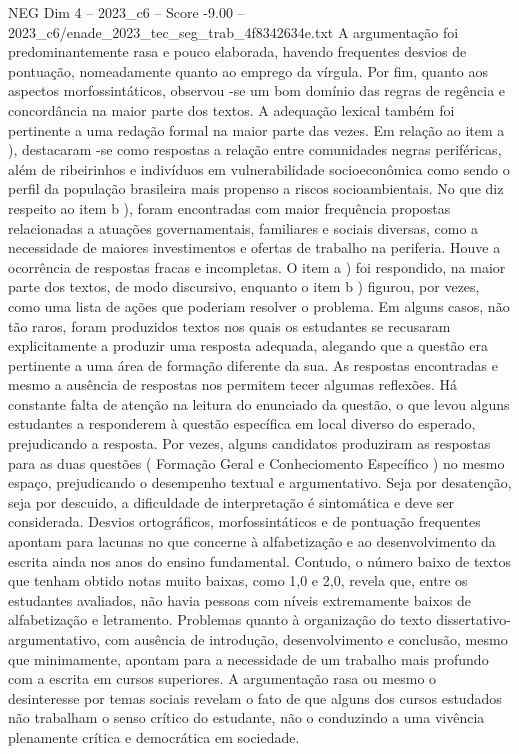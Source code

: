 \begin{textsample}{NEG Dim 4 – 2023\_c6 – Score -9.00 – 2023\_c6/enade\_2023\_tec\_seg\_trab\_4f8342634e.txt}
A argumentação foi predominantemente rasa e pouco elaborada, havendo frequentes desvios de pontuação, nomeadamente quanto ao emprego da vírgula.
Por fim, quanto aos aspectos morfossintáticos, observou -se um bom domínio das regras de regência e concordância na maior parte dos textos.
A adequação lexical também foi pertinente a uma redação formal na maior parte das vezes.
Em relação ao item a ), destacaram -se como respostas a relação entre comunidades negras periféricas, além de ribeirinhos e indivíduos em vulnerabilidade socioeconômica como sendo o perfil da população brasileira mais propenso a riscos socioambientais.
No que diz respeito ao item b ), foram encontradas com maior frequência propostas relacionadas a atuações governamentais, familiares e sociais diversas, como a necessidade de maiores investimentos e ofertas de trabalho na periferia.
Houve a ocorrência de respostas fracas e incompletas.
O item a ) foi respondido, na maior parte dos textos, de modo discursivo, enquanto o item b ) figurou, por vezes, como uma lista de ações que poderiam resolver o problema.
Em alguns casos, não tão raros, foram produzidos textos nos quais os estudantes se recusaram explicitamente a produzir uma resposta adequada, alegando que a questão era pertinente a uma área de formação diferente da sua.
As respostas encontradas e mesmo a ausência de respostas nos permitem tecer algumas reflexões.
Há constante falta de atenção na leitura do enunciado da questão, o que levou alguns estudantes a responderem à questão específica em local diverso do esperado, prejudicando a resposta.
Por vezes, alguns candidatos produziram as respostas para as duas questões ( Formação Geral e Conheciomento Específico ) no mesmo espaço, prejudicando o desempenho textual e argumentativo.
Seja por desatenção, seja por descuido, a dificuldade de interpretação é sintomática e deve ser considerada.
Desvios ortográficos, morfossintáticos e de pontuação frequentes apontam para lacunas no que concerne à alfabetização e ao desenvolvimento da escrita ainda nos anos do ensino fundamental.
Contudo, o número baixo de textos que tenham obtido notas muito baixas, como 1,0 e 2,0, revela que, entre os estudantes avaliados, não havia pessoas com níveis extremamente baixos de alfabetização e letramento.
Problemas quanto à organização do texto dissertativo-argumentativo, com ausência de introdução, desenvolvimento e conclusão, mesmo que minimamente, apontam para a necessidade de um trabalho mais profundo com a escrita em cursos superiores.
A argumentação rasa ou mesmo o desinteresse por temas sociais revelam o fato de que alguns dos cursos estudados não trabalham o senso crítico do estudante, não o conduzindo a uma vivência plenamente crítica e democrática em sociedade.

\end{textsample}

